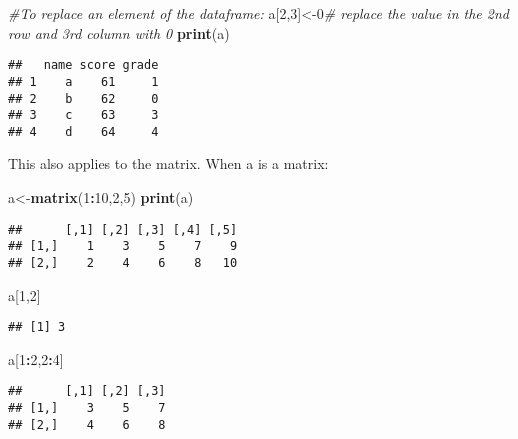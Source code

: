 \documentclass[]{book}
\newenvironment{Shaded}{\begin{snugshade}}{\end{snugshade}}
\newcommand{\KeywordTok}[1]{\textcolor[rgb]{0.13,0.29,0.53}{\textbf{#1}}}
\newcommand{\DecValTok}[1]{\textcolor[rgb]{0.00,0.00,0.81}{#1}}
\newcommand{\CommentTok}[1]{\textcolor[rgb]{0.56,0.35,0.01}{\textit{#1}}}
\newcommand{\OperatorTok}[1]{\textcolor[rgb]{0.81,0.36,0.00}{\textbf{#1}}}
\newcommand{\NormalTok}[1]{#1}
\theoremstyle{definition}
\theoremstyle{definition}
\theoremstyle{definition}
\theoremstyle{remark}
\begin{document}
\begin{Shaded}
\begin{Highlighting}[]
\CommentTok{#To replace an element of the dataframe:}
\NormalTok{a[}\DecValTok{2}\NormalTok{,}\DecValTok{3}\NormalTok{]<-}\DecValTok{0}\CommentTok{# replace the value in the 2nd row and 3rd column with 0}
\KeywordTok{print}\NormalTok{(a)}
\end{Highlighting}
\end{Shaded}

\begin{verbatim}
##   name score grade
## 1    a    61     1
## 2    b    62     0
## 3    c    63     3
## 4    d    64     4
\end{verbatim}

This also applies to the matrix. When a is a matrix:

\begin{Shaded}
\begin{Highlighting}[]
\NormalTok{a<-}\KeywordTok{matrix}\NormalTok{(}\DecValTok{1}\OperatorTok{:}\DecValTok{10}\NormalTok{,}\DecValTok{2}\NormalTok{,}\DecValTok{5}\NormalTok{)}
\KeywordTok{print}\NormalTok{(a)}
\end{Highlighting}
\end{Shaded}

\begin{verbatim}
##      [,1] [,2] [,3] [,4] [,5]
## [1,]    1    3    5    7    9
## [2,]    2    4    6    8   10
\end{verbatim}

\begin{Shaded}
\begin{Highlighting}[]
\NormalTok{a[}\DecValTok{1}\NormalTok{,}\DecValTok{2}\NormalTok{]}
\end{Highlighting}
\end{Shaded}

\begin{verbatim}
## [1] 3
\end{verbatim}

\begin{Shaded}
\begin{Highlighting}[]
\NormalTok{a[}\DecValTok{1}\OperatorTok{:}\DecValTok{2}\NormalTok{,}\DecValTok{2}\OperatorTok{:}\DecValTok{4}\NormalTok{]}
\end{Highlighting}
\end{Shaded}

\begin{verbatim}
##      [,1] [,2] [,3]
## [1,]    3    5    7
## [2,]    4    6    8
\end{verbatim}
\end{document}
